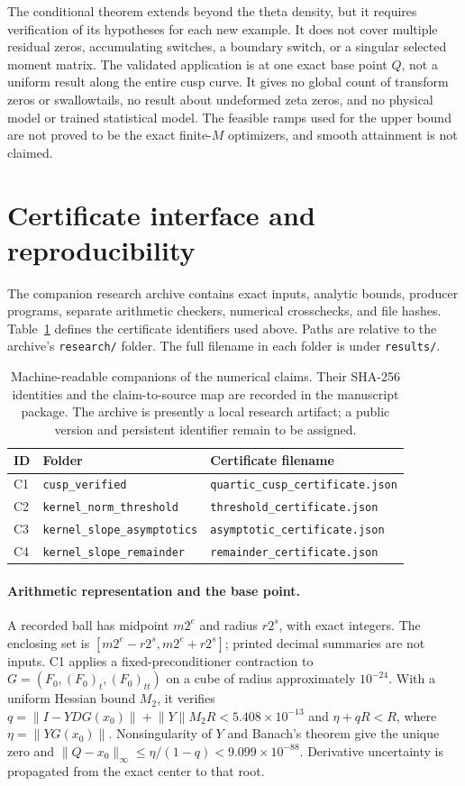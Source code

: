 \documentclass[11pt,a4paper]{article}
\numberwithin{equation}{section}
\theoremstyle{remark}\newtheorem{remark}[theorem]{Remark}
\newcommand{\norm}[1]{\lVert#1\rVert}
\begin{document}
The conditional theorem extends beyond the theta density, but it requires
verification of its hypotheses for each new example. It does not cover
multiple residual zeros, accumulating switches, a boundary switch, or a
singular selected moment matrix. The validated application is at one exact
base point $Q$, not a uniform result along the entire cusp curve. It gives
no global count of transform zeros or swallowtails, no result about
undeformed zeta zeros, and no physical model or trained statistical model.
The feasible ramps used for the upper bound are not proved to be the exact
finite-$M$ optimizers, and smooth attainment is not claimed.

\appendix
\section{Certificate interface and reproducibility}\label{app:archive}
The companion research archive contains exact inputs, analytic bounds,
producer programs, separate arithmetic checkers, numerical crosschecks,
and file hashes. Table~\ref{tab:archive} defines the certificate identifiers
used above. Paths are relative to the archive's \texttt{research/} folder.
The full filename in each folder is under \texttt{results/}.

\begin{table}[htbp]
\centering\footnotesize
\begin{tabular}{lll}
\toprule
ID & Folder & Certificate filename\\\midrule
C1 & \texttt{cusp\_verified} & \texttt{quartic\_cusp\_certificate.json}\\
C2 & \texttt{kernel\_norm\_threshold} & \texttt{threshold\_certificate.json}\\
C3 & \texttt{kernel\_slope\_asymptotics} & \texttt{asymptotic\_certificate.json}\\
C4 & \texttt{kernel\_slope\_remainder} & \texttt{remainder\_certificate.json}\\
\bottomrule
\end{tabular}
\caption{Machine-readable companions of the numerical claims. Their
SHA-256 identities and the claim-to-source map are recorded in the
manuscript package. The archive is presently a local research artifact;
a public version and persistent identifier remain to be assigned.}
\label{tab:archive}
\end{table}

\paragraph{Arithmetic representation and the base point.}
A recorded ball has midpoint $m2^e$ and radius $r2^s$, with exact integers.
The enclosing set is $[m2^e-r2^s,m2^e+r2^s]$; printed decimal summaries are
not inputs. C1 applies a fixed-preconditioner contraction to
$G=(F_0,(F_0)_t,(F_0)_{tt})$ on a cube of radius approximately $10^{-24}$.
With a uniform Hessian bound $M_2$, it verifies
$q=\norm{I-YDG(x_0)}+\norm Y M_2R<5.408\times10^{-13}$ and
$\eta+qR<R$, where $\eta=\norm{YG(x_0)}$. Nonsingularity of $Y$ and
Banach's theorem give the unique zero and
$\norm{Q-x_0}_\infty\le\eta/(1-q)<9.099\times10^{-88}$.
Derivative uncertainty is propagated from the exact center to that root.
\end{document}
